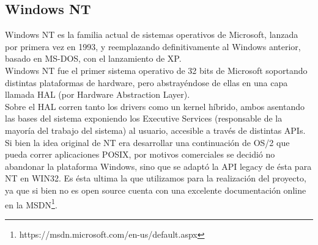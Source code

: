 \subsection{Windows NT}

Windows NT es la familia actual de sistemas operativos de Microsoft, lanzada
por primera vez en 1993, y reemplazando definitivamente al Windows anterior,
basado en MS-DOS, con el lanzamiento de XP.\\

Windows NT fue el primer sistema operativo de 32 bits de Microsoft soportando
distintas plataformas de hardware, pero abstrayéndose de ellas en una capa
llamada HAL (por Hardware Abstraction Layer).\\

Sobre el HAL corren tanto los drivers como un kernel híbrido, ambos asentando
las bases del sistema exponiendo los Executive Services (responsable de la
mayoría del trabajo del sistema) al usuario, accesible a través de distintas
APIs.\\

Si bien la idea original de NT era desarrollar una continuación de OS/2 que
pueda correr aplicaciones POSIX, por motivos comerciales se decidió no abandonar
la plataforma Windows, sino que se adaptó la API legacy de ésta para NT en
WIN32. Es ésta ultima la que utilizamos para la realización del proyecto, ya que
si bien no es open source cuenta con una excelente documentación online
en la MSDN\footnote{https://msdn.microsoft.com/en-us/default.aspx}.\\

